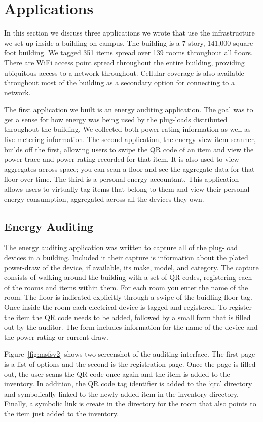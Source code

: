 \section{Applications}
\label{sec:apps}
In this section we discuss three applications we wrote that use the infrastructure we set up inside a building on campus.
The building is a 7-story, 141,000 square-foot building.  We tagged 351 items spread over 139 rooms throughout all floors.
There are WiFi access point spread throughout the entire building, providing ubiquitous access to a network throughout.
Cellular coverage is also available throughout most of the building as a secondary option for connecting to a network.

The first application we built is an energy auditing application.  The goal was to get a sense for how energy
was being used by the plug-loads distributed throughout the building.  We collected both power rating information as well
as live metering information.  The second application, the energy-view item scanner, builds off the first, allowing users
to swipe the QR code of an item and view the power-trace and power-rating recorded for that item.  It is also
used to view aggregates across space; you can scan a floor and see the aggregate data for that floor over time.  
The third is a personal energy accountant.  This application allows users to virtually tag items that belong to them 
and view their personal energy consumption, aggregated across all the devices they own.

\subsection{Energy Auditing}
\label{sec:eaudit}
The energy auditing application was written to capture all of the plug-load devices in a building.  Included it their
capture is information about the plated power-draw of the device, if available, its make, model, and category.
The capture consists of walking around the building with a set of QR codes, registering each of the rooms and items
within them.  For each room you enter the name of the room.  The floor is indicated explicitly through a swipe of the buidling
floor tag.  Once inside the room each electrical device is tagged and registered.  To register the item the QR code needs
to be added, followed by a small form that is filled out by the auditor.  The form includes information for the name
of the device and the power rating or current draw.  

Figure~\ref{fig:msfsv2} shows two screenshot of the auditing interface.  The first page is a list of options and the second is
the registration page.  Once the page is filled out, the user scans the QR code once again and the item is added to the inventory.
In addition, the QR code tag identifier is added to the `qrc' directory and symbolically linked to the newly added item
in the inventory directory.  Finally, a symbolic link is create in the directory for the room that also points to the item
just added to the inventory.

